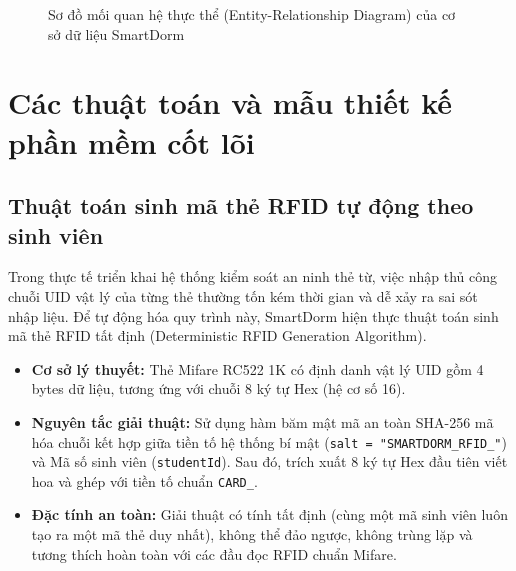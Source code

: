 \begin{figure}[H]
\caption{Sơ đồ mối quan hệ thực thể (Entity-Relationship Diagram) của cơ sở dữ liệu SmartDorm}
\label{fig:erd_diagram}
\end{figure}

\section{Các thuật toán và mẫu thiết kế phần mềm cốt lõi}
\label{sec:thuat_toan_patterns}

\subsection{Thuật toán sinh mã thẻ RFID tự động theo sinh viên}
\label{subsec:thuat_toan_rfid}

Trong thực tế triển khai hệ thống kiểm soát an ninh thẻ từ, việc nhập thủ công chuỗi UID vật lý của từng thẻ thường tốn kém thời gian và dễ xảy ra sai sót nhập liệu. Để tự động hóa quy trình này, SmartDorm hiện thực thuật toán sinh mã thẻ RFID tất định (Deterministic RFID Generation Algorithm).

\begin{itemize}
    \item \textbf{Cơ sở lý thuyết:} Thẻ Mifare RC522 1K có định danh vật lý UID gồm 4 bytes dữ liệu, tương ứng với chuỗi 8 ký tự Hex (hệ cơ số 16).
    \item \textbf{Nguyên tắc giải thuật:} Sử dụng hàm băm mật mã an toàn SHA-256 mã hóa chuỗi kết hợp giữa tiền tố hệ thống bí mật (\texttt{salt = "SMARTDORM\_RFID\_"}) và Mã số sinh viên (\texttt{studentId}). Sau đó, trích xuất 8 ký tự Hex đầu tiên viết hoa và ghép với tiền tố chuẩn \texttt{CARD\_}.
    \item \textbf{Đặc tính an toàn:} Giải thuật có tính tất định (cùng một mã sinh viên luôn tạo ra một mã thẻ duy nhất), không thể đảo ngược, không trùng lặp và tương thích hoàn toàn với các đầu đọc RFID chuẩn Mifare.
\end{itemize}

